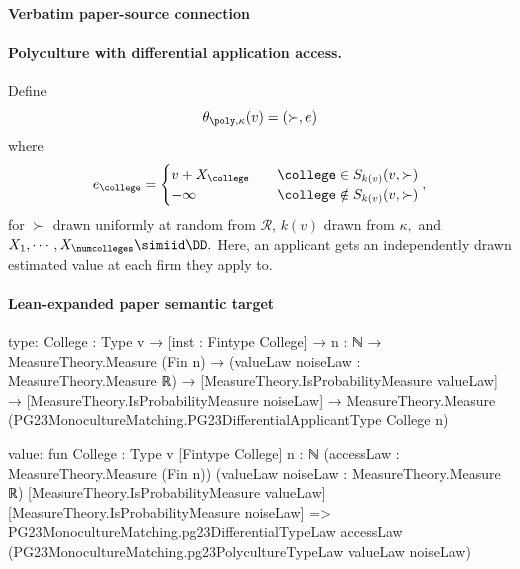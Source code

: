 \documentclass[10pt]{article}
\begin{document}
\paragraph{Verbatim paper-source connection}
\begin{ReviewVerbatim}
\paragraph{Polyculture with differential application access.} Define
\begin{equation}
    \theta_{\poly, \kappa}(v) = (\succ, e)
\end{equation}
where
\begin{equation}
    e_\college =
    \begin{cases}
        v + X_\college &\quad \college\in S_{k(v)}(v, \succ)\\
        -\infty &\quad \college\notin S_{k(v)}(v, \succ)
    \end{cases},
\end{equation}
for $\succ$ drawn uniformly at random from $\mathcal{R}$, $k(v)$ drawn from $\kappa,$ and $X_1,\cdots,X_\numcolleges\simiid \DD.$ Here, an applicant gets an independently drawn estimated value at each firm they apply to.
\end{ReviewVerbatim}



\paragraph{Lean-expanded paper semantic target}
\begin{ReviewVerbatim}
type:
{College : Type v} →
  [inst : Fintype College] →
    {n : ℕ} →
      MeasureTheory.Measure (Fin n) →
        (valueLaw noiseLaw : MeasureTheory.Measure ℝ) →
          [MeasureTheory.IsProbabilityMeasure valueLaw] →
            [MeasureTheory.IsProbabilityMeasure noiseLaw] →
              MeasureTheory.Measure (PG23MonocultureMatching.PG23DifferentialApplicantType College n)

value:
fun {College : Type v} [Fintype College] {n : ℕ} (accessLaw : MeasureTheory.Measure (Fin n))
    (valueLaw noiseLaw : MeasureTheory.Measure ℝ) [MeasureTheory.IsProbabilityMeasure valueLaw]
    [MeasureTheory.IsProbabilityMeasure noiseLaw] =>
  PG23MonocultureMatching.pg23DifferentialTypeLaw accessLaw
    (PG23MonocultureMatching.pg23PolycultureTypeLaw valueLaw noiseLaw)
\end{ReviewVerbatim}
\end{document}
